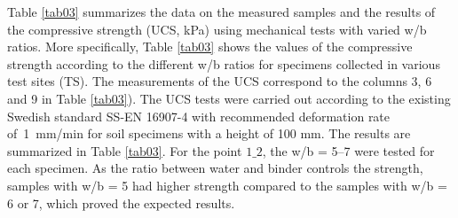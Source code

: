 \documentclass[sustainability,article,accept,pdftex,moreauthors]{Definitions/mdpi}
\begin{document}
{{{Table} \ref{tab03} {summarizes the data on the measured samples and the results of the compressive strength (UCS, kPa) using mechanical tests with varied w/b ratios. More specifically, Table} \ref{tab03} shows the values of the compressive strength {according to the different} w/b {ratios }for specimens collected in various test sites (TS). {The measurements of the UCS correspond to the columns 3, 6 and 9 in Table} \ref{tab03}). {The} UCS tests were carried out according to the existing Swedish standard SS-EN 16907-4 \cite{SIS2018} with recommended deformation rate \mbox{of 1 mm/min} for soil specimens with a height of 100 mm. The results are summarized in Table \ref{tab03}. For the point $1\_2$, the w/b = 5--7 were tested for each specimen. As the ratio between water and binder controls the strength, samples with w/b = 5 had higher strength compared to {the }samples with w/b = 6 or 7, which proved the expected results. 

}}
\end{document}
